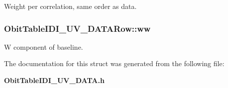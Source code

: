 Weight per correlation, same order as data. 

\subsubsection{ {\bf Obit\-Table\-IDI\_\-UV\_\-DATARow::ww}}\label{structObitTableIDI__UV__DATARow_o8}


W component of baseline. 



The documentation for this struct was generated from the following file:\begin{CompactItemize}
\item 
{\bf Obit\-Table\-IDI\_\-UV\_\-DATA.h}\end{CompactItemize}
